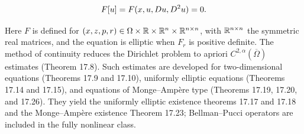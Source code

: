 \begin{equation}\label{gt.eq1.11}\dcref{(1.8)}\group{chapter-1}\source{gilbarg-trudinger:page-0020}
F[u] = F(x,u,Du,D^2u) = 0.
\end{equation}

Here $F$ is defined for
$(x,z,p,r)\in\Omega\times\R\times\R^n\times\R^{n\times n}$, with
$\R^{n\times n}$ the symmetric real matrices, and the equation is elliptic when
$F_r$ is positive definite. The method of continuity reduces the Dirichlet
problem to apriori $C^{2,\alpha}(\overline\Omega)$ estimates (Theorem 17.8).
Such estimates are developed for two-dimensional equations (Theorems 17.9 and
17.10), uniformly elliptic equations (Theorems 17.14 and 17.15), and equations
of Monge--Amp\`ere type (Theorems 17.19, 17.20, and 17.26). They yield the
uniformly elliptic existence theorems 17.17 and 17.18 and the Monge--Amp\`ere
existence Theorem 17.23; Bellman--Pucci operators are included in the fully
nonlinear class.

\bigskip

